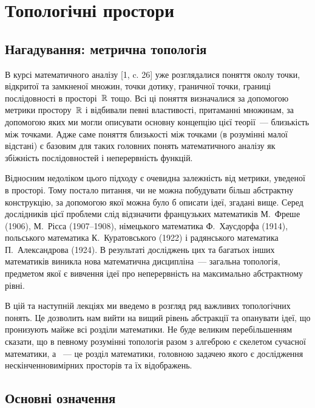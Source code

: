 \chapter{Топологічні простори}

\section{Нагадування: метрична топологія}

В курсі математичного аналізу [1, c. 26] уже розглядалися поняття околу точки, відкритої та замкненої множин, точки дотику, граничної точки, границі послідовності в просторі~$\mathbb{R}$ тощо. Всі ці поняття визначалися за допомогою метрики простору~$\mathbb{R}$ і відбивали певні властивості, притаманні множинам, за допомогою яких ми могли описувати основну концепцію цієї теорії~--- близькість між точками. Адже саме поняття близькості між точками (в розумінні малої відстані) є базовим для таких головних понять математичного аналізу як збіжність послідовностей і неперервність функцій.

Відносним недоліком цього підходу є очевидна залежність від метрики, уведеної в просторі. Тому постало питання, чи не можна побудувати більш абстрактну конструкцію, за допомогою якої можна було б описати ідеї, згадані вище. Серед дослідників цієї проблеми слід відзначити французьких математиків М.~Фреше (1906), М.~Рісса (1907--1908), німецького математика Ф.~Хаусдорфа (1914), польського математика К.~Куратовського (1922) і радянського математика П.~Александрова (1924). В результаті досліджень цих та багатьох інших математиків виникла нова математична дисципліна~--- загальна топологія, предметом якої є вивчення ідеї про неперервність на максимально абстрактному рівні.

В цій та наступній лекціях ми введемо в розгляд ряд важливих топологічних понять. Це дозволить нам вийти на вищий рівень абстракції та опанувати ідеї, що пронизують майже всі розділи математики. Не буде великим перебільшенням сказати, що в певному розумінні топологія разом з алгеброю є скелетом сучасної математики, а ~--- це розділ математики, головною задачею якого є дослідження нескінченновимірних просторів та їх відображень.

\section{Основні означення}

